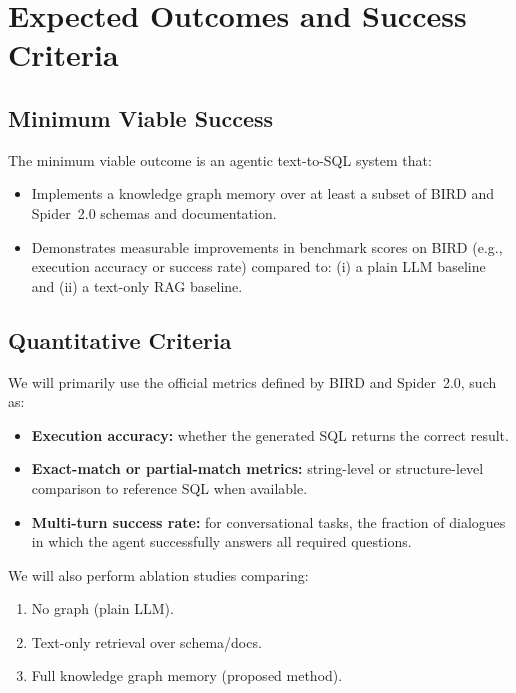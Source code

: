 \documentclass[11pt]{article}
\begin{document}
\section{Expected Outcomes and Success Criteria}

\subsection{Minimum Viable Success}

The minimum viable outcome is an agentic text-to-SQL system that:

\begin{itemize}[leftmargin=*]
  \item Implements a knowledge graph memory over at least a subset of BIRD and Spider~2.0 schemas and documentation.
  \item Demonstrates measurable improvements in benchmark scores on BIRD (e.g., execution accuracy or success rate) compared to:
  (i) a plain LLM baseline and
  (ii) a text-only RAG baseline.
\end{itemize}

\subsection{Quantitative Criteria}

We will primarily use the official metrics defined by BIRD and Spider~2.0, such as:

\begin{itemize}[leftmargin=*]
  \item \textbf{Execution accuracy:} whether the generated SQL returns the correct result.
  \item \textbf{Exact-match or partial-match metrics:} string-level or structure-level comparison to reference SQL when available.
  \item \textbf{Multi-turn success rate:} for conversational tasks, the fraction of dialogues in which the agent successfully answers all required questions.
\end{itemize}

We will also perform ablation studies comparing:

\begin{enumerate}[leftmargin=*]
  \item No graph (plain LLM).
  \item Text-only retrieval over schema/docs.
  \item Full knowledge graph memory (proposed method).
\end{enumerate}
\end{document}

